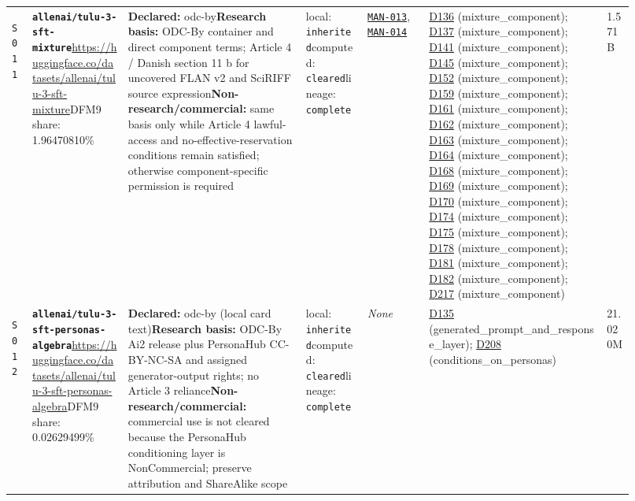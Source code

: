 \documentclass[9pt,a4paper]{article}
\newcommand{\srcid}[1]{\hypertarget{src:#1}{\texttt{#1}}}
\begin{document}
\begin{landscape}
\begin{longtable}{@{}L{0.03\linewidth}L{0.14\linewidth}L{0.26\linewidth}L{0.09\linewidth}L{0.09\linewidth}L{0.265\linewidth}L{0.045\linewidth}@{}}
\srcid{S011} & \textbf{\nolinkurl{allenai/tulu-3-sft-mixture}}\newline \url{https://huggingface.co/datasets/allenai/tulu-3-sft-mixture}\newline DFM9 share: 1.96470810\% & \textbf{Declared:} odc-by\newline \textbf{Research basis:} ODC-By container and direct component terms; Article 4 / Danish section 11 b for uncovered FLAN v2 and SciRIFF source expression\newline \textbf{Non-research/commercial:} same basis only while Article 4 lawful-access and no-effective-reservation conditions remain satisfied; otherwise component-specific permission is required & local: \texttt{inherited}\newline computed: \texttt{cleared}\newline lineage: \texttt{complete} & \hyperlink{manual:MAN-013}{\texttt{MAN-013}}, \hyperlink{manual:MAN-014}{\texttt{MAN-014}} & \hyperlink{dep:D136}{D136} (mixture\_component); \hyperlink{dep:D137}{D137} (mixture\_component); \hyperlink{dep:D141}{D141} (mixture\_component); \hyperlink{dep:D145}{D145} (mixture\_component); \hyperlink{dep:D152}{D152} (mixture\_component); \hyperlink{dep:D159}{D159} (mixture\_component); \hyperlink{dep:D161}{D161} (mixture\_component); \hyperlink{dep:D162}{D162} (mixture\_component); \hyperlink{dep:D163}{D163} (mixture\_component); \hyperlink{dep:D164}{D164} (mixture\_component); \hyperlink{dep:D168}{D168} (mixture\_component); \hyperlink{dep:D169}{D169} (mixture\_component); \hyperlink{dep:D170}{D170} (mixture\_component); \hyperlink{dep:D174}{D174} (mixture\_component); \hyperlink{dep:D175}{D175} (mixture\_component); \hyperlink{dep:D178}{D178} (mixture\_component); \hyperlink{dep:D181}{D181} (mixture\_component); \hyperlink{dep:D182}{D182} (mixture\_component); \hyperlink{dep:D217}{D217} (mixture\_component) & 1.571B \\
\srcid{S012} & \textbf{\nolinkurl{allenai/tulu-3-sft-personas-algebra}}\newline \url{https://huggingface.co/datasets/allenai/tulu-3-sft-personas-algebra}\newline DFM9 share: 0.02629499\% & \textbf{Declared:} odc-by (local card text)\newline \textbf{Research basis:} ODC-By Ai2 release plus PersonaHub CC-BY-NC-SA and assigned generator-output rights; no Article 3 reliance\newline \textbf{Non-research/commercial:} commercial use is not cleared because the PersonaHub conditioning layer is NonCommercial; preserve attribution and ShareAlike scope & local: \texttt{inherited}\newline computed: \texttt{cleared}\newline lineage: \texttt{complete} & \textit{None} & \hyperlink{dep:D135}{D135} (generated\_prompt\_and\_response\_layer); \hyperlink{dep:D208}{D208} (conditions\_on\_personas) & 21.020M \\

\end{longtable}
\end{landscape}
\end{document}
